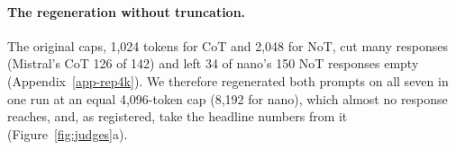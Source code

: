 \paragraph{The regeneration without truncation.}
The original caps, 1,024 tokens for CoT and 2,048 for NoT, cut many
responses (Mistral's CoT 126 of 142) and left 34 of nano's 150 NoT responses
empty (Appendix~\ref{app-rep4k}).
We therefore regenerated both prompts on all seven in one run at an equal
4,096-token cap (8,192 for nano), which almost no response reaches, and, as
registered, take the headline numbers from it (Figure~\ref{fig:judges}a).
